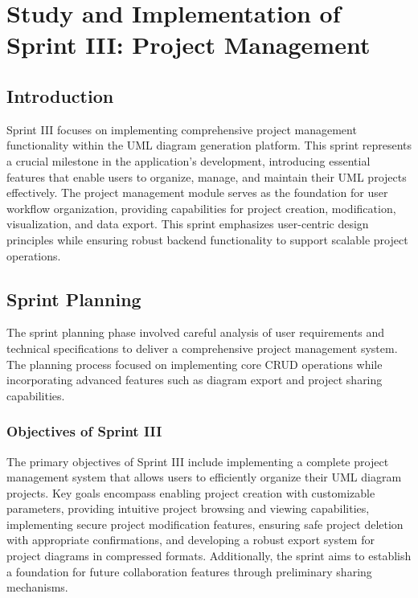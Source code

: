 \chapter[Sprint III]{Study and Implementation of Sprint III: Project Management}

\minitoc

\section{Introduction}

Sprint III focuses on implementing comprehensive project management functionality within the UML diagram generation platform. This sprint represents a crucial milestone in the application's development, introducing essential features that enable users to organize, manage, and maintain their UML projects effectively. The project management module serves as the foundation for user workflow organization, providing capabilities for project creation, modification, visualization, and data export. This sprint emphasizes user-centric design principles while ensuring robust backend functionality to support scalable project operations.

\section{Sprint Planning}

The sprint planning phase involved careful analysis of user requirements and technical specifications to deliver a comprehensive project management system. The planning process focused on implementing core CRUD operations while incorporating advanced features such as diagram export and project sharing capabilities.

\subsection{Objectives of Sprint III}

The primary objectives of Sprint III include implementing a complete project management system that allows users to efficiently organize their UML diagram projects. Key goals encompass enabling project creation with customizable parameters, providing intuitive project browsing and viewing capabilities, implementing secure project modification features, ensuring safe project deletion with appropriate confirmations, and developing a robust export system for project diagrams in compressed formats. Additionally, the sprint aims to establish a foundation for future collaboration features through preliminary sharing mechanisms.

